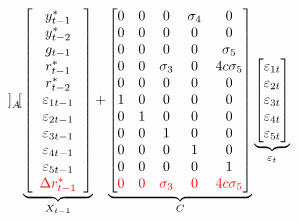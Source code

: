 \documentclass[a4paper,12pt]{article}
\begin{document}
\begin{align}
{\begin{bmatrix}
\end{bmatrix}%
}_{A}\underbrace{\left[
\begin{array}{c}
y_{t-1}^{\ast } \\
y_{t-2}^{\ast } \\
g_{t-1} \\
r_{t-1}^{\ast } \\
r_{t-2}^{\ast } \\
\varepsilon _{1t-1} \\
\varepsilon _{2t-1} \\
\varepsilon _{3t-1} \\
\varepsilon _{4t-1} \\
\varepsilon _{5t-1} \\
\color{red}{\Delta r_{t-1}^*}%
\end{array}%
\right] }_{X_{t-1}}+\underbrace{%
\begin{bmatrix}
0 & 0 & 0 & \sigma _{4} & 0 \\
0 & 0 & 0 & 0 & 0 \\
0 & 0 & 0 & 0 & \sigma _{5} \\
0 & 0 & \sigma _{3} & 0 & 4c\sigma _{5} \\
0 & 0 & 0 & 0 & 0 \\
1 & 0 & 0 & 0 & 0 \\
0 & 1 & 0 & 0 & 0 \\
0 & 0 & 1 & 0 & 0 \\
0 & 0 & 0 & 1 & 0 \\
0 & 0 & 0 & 0 & 1 \\
\color{red}{0} & \color{red}{0} & \color{red}{\sigma _{3}} & \color{red}{0}
& \color{red}{4c\sigma _{5}}%
\end{bmatrix}%
}_{C}\underbrace{%
\begin{bmatrix}
\varepsilon _{1t} \\
\varepsilon _{2t} \\
\varepsilon _{3t} \\
\varepsilon _{4t} \\
\varepsilon _{5t}%
\end{bmatrix}%
}_{\varepsilon _{t}}
\end{align}
\end{document}
